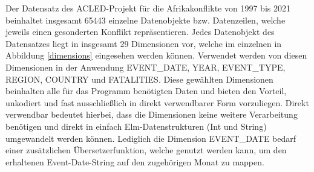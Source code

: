 \documentclass[usegeometry=true]{scrartcl}
\begin{document}
Der Datensatz des ACLED-Projekt für die Afrikakonflikte von 1997 bis 2021 beinhaltet insgesamt 65443 einzelne Datenobjekte bzw. Datenzeilen, welche jeweils einen gesonderten Konflikt repräsentieren. Jedes Datenobjekt des Datensatzes liegt in insgesamt 29 Dimensionen vor, welche im einzelnen in Abbildung \ref{dimensions} eingesehen werden können. Verwendet werden von diesen Dimensionen in der Anwendung EVENT\_DATE, YEAR, EVENT\_TYPE, REGION, COUNTRY und FATALITIES. Diese gewählten Dimensionen beinhalten alle für das Programm benötigten Daten und bieten den Vorteil, unkodiert und fast ausschließlich in direkt verwendbarer Form vorzuliegen. Direkt verwendbar bedeutet hierbei, dass die Dimensionen keine weitere Verarbeitung benötigen und direkt in einfach Elm-Datenstrukturen (Int und String) umgewandelt werden können. Lediglich die Dimension EVENT\_DATE bedarf einer zusätzlichen Übersetzerfunktion, welche genutzt werden kann, um den erhaltenen Event-Date-String auf den zugehörigen Monat zu mappen.\\
\end{document}
